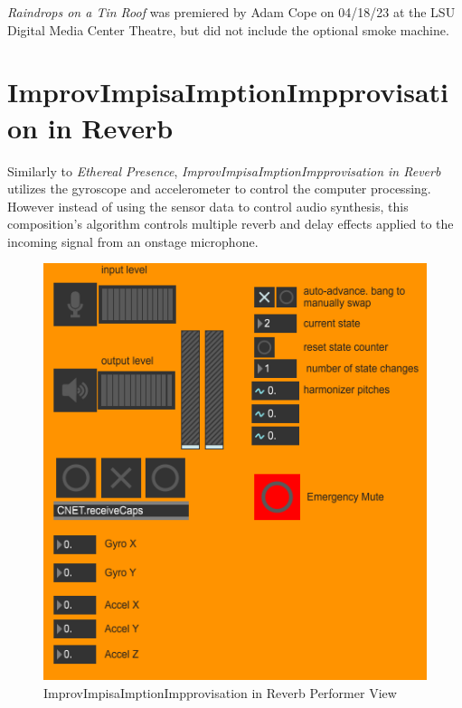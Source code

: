\textit{Raindrops on a Tin Roof} was premiered by Adam Cope on 04/18/23 at the LSU Digital Media Center Theatre, but did not include the optional smoke machine.

\section{ImprovImpisaImptionImpprovisation in Reverb}
Similarly to \textit{Ethereal Presence}, \textit{ImprovImpisaImptionImpprovisation in Reverb} utilizes the gyroscope and accelerometer to control the computer processing. However instead of using the sensor data to control audio synthesis, this composition's algorithm controls multiple reverb and delay effects applied to the incoming signal from an onstage microphone.

\begin{figure}
    \centering
    \includegraphics{diagrams/maxPatches/imporvPres.png}
    \caption{ImprovImpisaImptionImpprovisation in Reverb Performer View}
    \label{fig:ImprovPres}
\end{figure}

